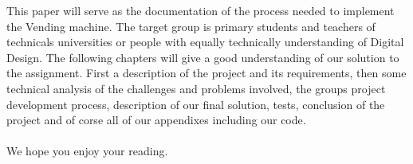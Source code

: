 This paper will serve as the documentation of the process needed to implement the Vending machine.
The target group is primary students and teachers of technicals universities or people with equally technically understanding of Digital Design. 
The following chapters will give a good understanding of our solution to the assignment. First a description of the project and its requirements, then some technical analysis of the challenges and problems involved, the groups project development process, description of our final solution, tests, conclusion of the project and of corse all of our appendixes including our code. 
\\ \\
We hope you enjoy your reading.




